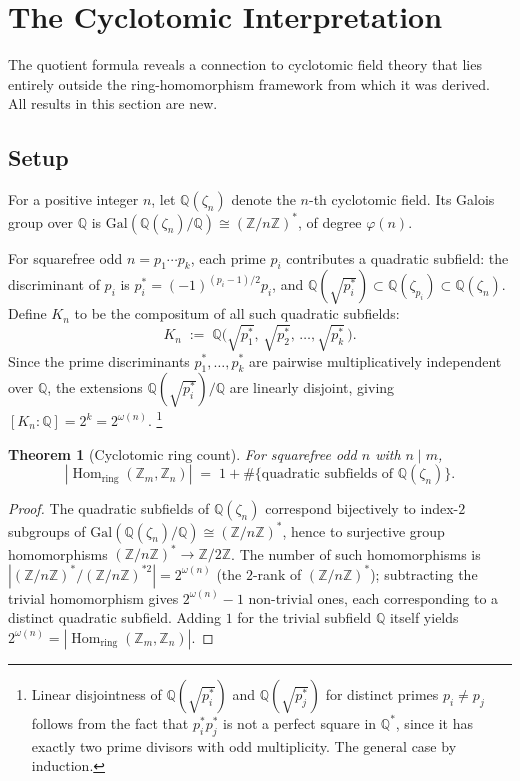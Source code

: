 \documentclass[12pt]{amsart}
\theoremstyle{bluehead}
\newtheorem{theorem}{Theorem}[section]
\theoremstyle{orangehead}
\theoremstyle{greenhead}
\newcommand{\Z}{\mathbb{Z}}
\newcommand{\Q}{\mathbb{Q}}
\newcommand{\Hring}{\operatorname{Hom}_{\mathrm{ring}}}
\renewcommand{\phi}{\varphi}
\begin{document}

\section{The Cyclotomic Interpretation}\label{sec:cyclo}

The quotient formula reveals a connection to cyclotomic field theory
that lies entirely outside the ring-homomorphism framework from which
it was derived.  All results in this section are new.

\subsection*{Setup}

For a positive integer $n$, let $\Q(\zeta_n)$ denote the $n$-th
cyclotomic field.  Its Galois group over $\Q$ is
$\mathrm{Gal}(\Q(\zeta_n)/\Q)\cong(\Z/n\Z)^*$, of degree $\phi(n)$.

For squarefree odd $n=p_1\cdots p_k$, each prime $p_i$ contributes
a quadratic subfield: the discriminant of $p_i$ is $p_i^*=(-1)^{(p_i-1)/2}p_i$,
and $\Q(\sqrt{p_i^*})\subset\Q(\zeta_{p_i})\subset\Q(\zeta_n)$.
Define $K_n$ to be the compositum of all such quadratic subfields:
\[
  K_n\;:=\;\Q\!\bigl(\sqrt{p_1^*},\,\sqrt{p_2^*},\,\ldots,\sqrt{p_k^*}\,\bigr).
\]
Since the prime discriminants $p_1^*,\ldots,p_k^*$ are pairwise
multiplicatively independent over $\Q$, the extensions
$\Q(\sqrt{p_i^*})/\Q$ are linearly disjoint, giving
$[K_n:\Q]=2^k=2^{\omega(n)}$.%
\footnote{Linear disjointness of $\Q(\sqrt{p_i^*})$ and $\Q(\sqrt{p_j^*})$
  for distinct primes $p_i\ne p_j$ follows from the fact that $p_i^*p_j^*$
  is not a perfect square in $\Q^*$, since it has exactly two prime divisors
  with odd multiplicity.  The general case by induction.}

\begin{theorem}[Cyclotomic ring count]\label{thm:cyclo-ring}
  For squarefree odd $n$ with $n\mid m$,
  \[
    |\Hring(\Z_m,\Z_n)|\;=\;1+\#\{\text{quadratic subfields of }\Q(\zeta_n)\}.
  \]
\end{theorem}

\begin{proof}
The quadratic subfields of $\Q(\zeta_n)$ correspond bijectively to
index-$2$ subgroups of $\mathrm{Gal}(\Q(\zeta_n)/\Q)\cong(\Z/n\Z)^*$,
hence to surjective group homomorphisms $(\Z/n\Z)^*\to\Z/2\Z$.
The number of such homomorphisms is $|(\Z/n\Z)^*/(\Z/n\Z)^{*2}|=2^{\omega(n)}$
(the $2$-rank of $(\Z/n\Z)^*$); subtracting the trivial homomorphism
gives $2^{\omega(n)}-1$ non-trivial ones, each corresponding to a
distinct quadratic subfield.
Adding $1$ for the trivial subfield $\Q$ itself yields
$2^{\omega(n)}=|\Hring(\Z_m,\Z_n)|$.
\qedhere
\end{proof}
\end{document}
